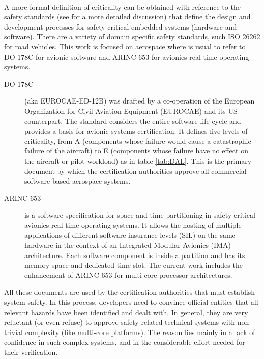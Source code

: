 \paragraph{}A more formal definition of criticality can be obtained with reference to the safety standards (see \cite{MCSmisconception} for a more detailed discussion) that define the design and development processes for safety-critical embedded systems (hardware and software). There are a variety of domain specific safety standards, such ISO 26262 for road vehicles. This work is focused on aerospace where is usual to refer to DO-178C \cite{do178c} for avionic software and ARINC 653 \cite{arinc653} for avionics real-time operating systems. %
\begin{description}
	\item[DO-178C] (aka EUROCAE-ED-12B) was drafted by a co-operation of the European Organization for Civil Aviation Equipment (EUROCAE) and its US counterpart. The standard considers the entire software life-cycle and provides a basis for avionic systems certification. It defines five levels of criticality, from A (components whose failure would cause a catastrophic failure of the aircraft) to E (components whose failure have no effect on the aircraft or pilot workload) as in table \ref{tab:DAL}. This is the primary document by which the certification authorities approve all commercial software-based aerospace systems.
	\item[ARINC-653] is a software specification for space and time partitioning in safety-critical avionics real-time operating systems. It allows the hosting of multiple applications of different software insurance levels (SIL) on the same hardware in the context of an Integrated Modular Avionics (IMA) architecture. Each software component is inside a partition and has its memory space and dedicated time slot. The current work includes the enhancement of ARINC-653 for multi-core processor architectures.
\end{description}
All these documents are used by the certification authorities that must establish system safety. In this process, developers need to convince official entities that all relevant hazards have been identified and dealt with. In general, they are very reluctant (or even refuse) to approve safety-related technical systems with non-trivial complexity (like multi-core platforms). The reason lies mainly in a lack of confidence in such complex systems, and in the considerable effort needed for their verification. %


